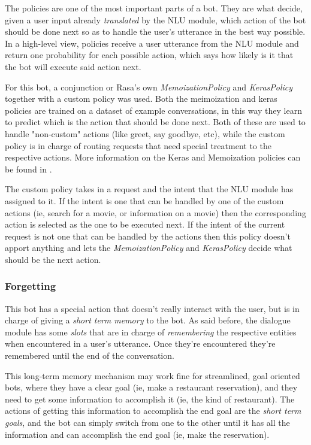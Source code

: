 \documentclass[11pt,a4paper]{article}
\begin{document}
			The policies are one of the most important parts of a bot. They are what decide, given a user input already \textit{translated} by the NLU module, which action of the bot should be done next so as to handle the user's utterance in the best way possible. In a high-level view, policies receive a user utterance from the NLU module and return one probability for each possible action, which says how likely is it that the bot will execute said action next.
			
			For this bot, a conjunction or Rasa's own \textit{MemoizationPolicy} and \textit{KerasPolicy} together with a custom policy was used. Both the meimoization and keras policies are trained on a dataset of example conversations, in this way they learn to predict which is the action that should be done next. Both of these are used to handle "non-custom" actions (like greet, say goodbye, etc), while the custom policy is in charge of routing requests that need special treatment to the respective actions. More information on the Keras and Memoization policies can be found in \cite{rasacore}.
			
			The custom policy takes in a request and the intent that the NLU module has assigned to it. If the intent is one that can be handled by one of the custom actions (ie, search for a movie, or information on a movie) then the corresponding action is selected as the one to be executed next. If the intent of the current request is not one that can be handled by the actions then this policy doesn't apport anything and lets the \textit{MemoizationPolicy} and \textit{KerasPolicy} decide what should be the next action.
		
		
		\subsubsection{Forgetting}
		\label{ssec-forgetting}	
		
			This bot has a special action that doesn't really interact with the user, but is in charge of giving a \textit{short term memory} to the bot. As said before, the dialogue module has some \textit{slots} that are in charge of \textit{remembering} the respective entities when encountered in a user's utterance. Once they're encountered they're remembered until the end of the conversation. 
			
			This long-term memory mechanism may work fine for streamlined, goal oriented bots, where they have a clear goal (ie, make a restaurant reservation), and they need to get some information to accomplish it (ie, the kind of restaurant). The actions of getting this information to accomplish the end goal are the \textit{short term goals}, and the bot can simply switch from one to the other until it has all the information and can accomplish the end goal (ie, make the reservation). 
			
\end{document}

